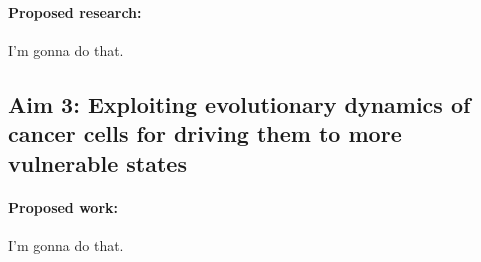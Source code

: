 \documentclass[12pt,letterpaper]{article}
\begin{document}
\paragraph{Proposed research:}
I'm gonna do that.

\subsection*{Aim 3: Exploiting evolutionary dynamics of cancer cells for driving them to more vulnerable states}
\paragraph{Proposed work:}
I'm gonna do that.

\clearpage

\footnotesize{
{}
}
\end{document}

